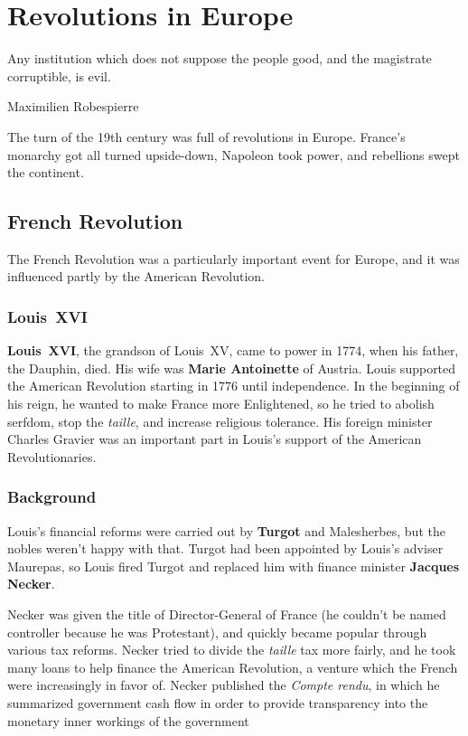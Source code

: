 \chapter{Revolutions in Europe}

\epigraph{%
  Any institution which does not suppose the people good, and the magistrate corruptible, is evil.
}{Maximilien Robespierre}

The turn of the 19th century was full of revolutions in Europe.
France's monarchy got all turned upside-down, Napoleon took power, and rebellions swept the continent.

\section{French Revolution}

The French Revolution was a particularly important event for Europe,
and it was influenced partly by the American Revolution.

\subsection*{Louis~XVI}

\textbf{Louis~XVI}, the grandson of Louis~XV, came to power in 1774, when his father, the Dauphin, died.
His wife was \textbf{Marie Antoinette} of Austria.
Louis supported the American Revolution starting in 1776 until independence.
In the beginning of his reign, he wanted to make France more Enlightened,
so he tried to abolish serfdom, stop the \textit{taille}, and increase religious tolerance.
His foreign minister Charles Gravier was an important part in Louis's support of the American Revolutionaries.

\subsection*{Background}

Louis's financial reforms were carried out by \textbf{Turgot} and Malesherbes, but the nobles weren't happy with that.
Turgot had been appointed by Louis's adviser Maurepas,
so Louis fired Turgot and replaced him with finance minister \textbf{Jacques Necker}.

Necker was given the title of Director-General of France (he couldn't be named controller because he was Protestant),
and quickly became popular through various tax reforms.
Necker tried to divide the \textit{taille} tax more fairly,
and he took many loans to help finance the American Revolution,
a venture which the French were increasingly in favor of.
Necker published the \textit{Compte rendu},
in which he summarized government cash flow in order to provide transparency
into the monetary inner workings of the government

